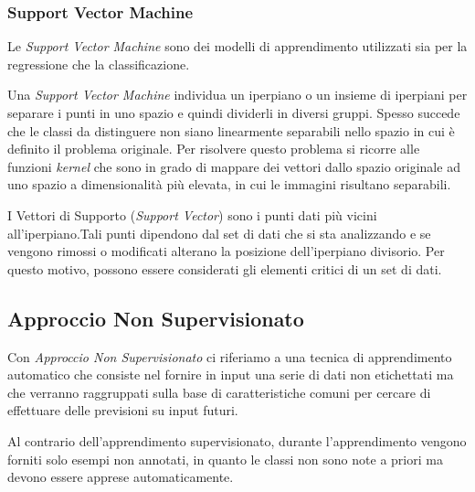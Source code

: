 \documentclass[a4paper,12pt]{report}
\begin{document}

\subsubsection{Support Vector Machine}
Le \textit{Support Vector Machine} sono dei modelli di apprendimento utilizzati sia per la regressione che la classificazione.

Una \textit{Support Vector Machine} individua un iperpiano o un insieme di iperpiani per separare i punti in uno spazio e quindi dividerli in diversi gruppi.
Spesso succede che le classi da distinguere non siano linearmente separabili nello spazio in cui è definito il problema originale. Per risolvere questo problema si ricorre alle funzioni \textit{kernel} che sono in grado di mappare dei vettori dallo spazio originale ad uno spazio a dimensionalità più elevata, in cui le immagini risultano separabili.

I Vettori di Supporto (\textit{Support Vector}) sono i punti dati più vicini all'iperpiano.Tali punti dipendono dal set di dati che si sta analizzando e se vengono rimossi o modificati alterano la posizione dell’iperpiano divisorio. Per questo motivo, possono essere considerati gli elementi critici di un set di dati.

\subsection*{Approccio Non Supervisionato}
Con \textit{Approccio Non Supervisionato} \cite{unsupervised_learning} ci riferiamo a una tecnica di apprendimento automatico che consiste nel fornire in input una serie di dati non etichettati ma che verranno raggruppati sulla base di caratteristiche comuni  per cercare di effettuare delle previsioni su input futuri.


Al contrario dell'apprendimento supervisionato, durante l'apprendimento vengono forniti solo esempi non annotati, in quanto le classi non sono note a priori ma devono essere apprese automaticamente.
\end{document}
